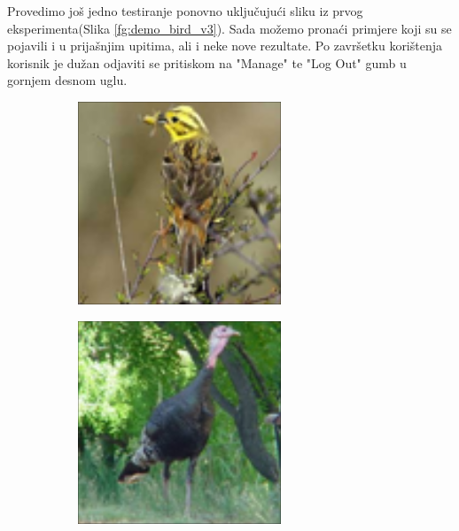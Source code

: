 \documentclass[times, utf8, proizvoljni, numeric]{fer}
\begin{document}
\newpage

Provedimo još jedno testiranje ponovno uključujući sliku iz prvog eksperimenta(Slika \ref{fg:demo_bird_v3}). Sada možemo pronaći primjere koji su se pojavili i u prijašnjim upitima, ali i neke nove rezultate. Po završetku korištenja korisnik je dužan odjaviti se pritiskom na "Manage" te "Log Out" gumb u gornjem desnom uglu.


\begin{figure}[ht!]
	\begin{subfigure}[t]{0.19\textwidth}
		\includegraphics[width=\textwidth,height=\textwidth ]{./imgs/demo-preporucitelja-po-sadrzaju/tijek-rada/id@0.png}
	\end{subfigure}
	\begin{subfigure}[t]{0.19\textwidth}
		\includegraphics[width=\textwidth,height=\textwidth ]{./imgs/demo-preporucitelja-po-sadrzaju/tijek-rada/id@2.png}

\end{subfigure}
\end{figure}
\end{document}
